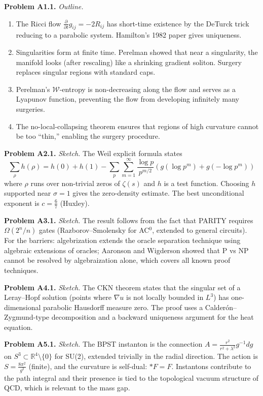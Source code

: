 \medskip\noindent\textbf{Problem A1.1.} \textit{Outline.}
\begin{enumerate}
\item[(a)] The Ricci flow $\frac{\partial}{\partial t} g_{ij} = -2R_{ij}$ has short-time existence by the DeTurck trick reducing to a parabolic system. Hamilton's 1982 paper gives uniqueness.
\item[(b)] Singularities form at finite time. Perelman showed that near a singularity, the manifold looks (after rescaling) like a shrinking gradient soliton. Surgery replaces singular regions with standard caps.
\item[(c)] Perelman's $\mathcal{W}$-entropy is non-decreasing along the flow and serves as a Lyapunov function, preventing the flow from developing infinitely many surgeries.
\item[(d)] The no-local-collapsing theorem ensures that regions of high curvature cannot be too ``thin,'' enabling the surgery procedure.
\end{enumerate}

\medskip\noindent\textbf{Problem A2.1.} \textit{Sketch.} The Weil explicit formula states
\[
\sum_\rho h(\rho) = h(0) + h(1) - \sum_p \sum_{m=1}^\infty \frac{\log p}{p^{m/2}} (g(\log p^m) + g(-\log p^m))
\]
where $\rho$ runs over non-trivial zeros of $\zeta(s)$ and $h$ is a test function. Choosing $h$ supported near $\sigma = 1$ gives the zero-density estimate. The best unconditional exponent is $c = \frac{6}{7}$ (Huxley).

\medskip\noindent\textbf{Problem A3.1.} \textit{Sketch.} The result follows from the fact that PARITY requires $\Omega(2^n / n)$ gates (Razborov--Smolensky for AC$^0$, extended to general circuits). For the barriers: algebrization extends the oracle separation technique using algebraic extensions of oracles; Aaronson and Wigderson showed that P vs NP cannot be resolved by algebraization alone, which covers all known proof techniques.

\medskip\noindent\textbf{Problem A4.1.} \textit{Sketch.} The CKN theorem states that the singular set of a Leray--Hopf solution (points where $\nabla u$ is not locally bounded in $L^3$) has one-dimensional parabolic Hausdorff measure zero. The proof uses a Calder\'{o}n--Zygmund-type decomposition and a backward uniqueness argument for the heat equation.

\medskip\noindent\textbf{Problem A5.1.} \textit{Sketch.} The BPST instanton is the connection $A = \frac{r^2}{r^2 + \lambda^2} g^{-1} dg$ on $S^3 \subset \mathbb{R}^4 \setminus \{0\}$ for SU(2), extended trivially in the radial direction. The action is $S = \frac{8\pi^2}{g^2}$ (finite), and the curvature is self-dual: $*F = F$. Instantons contribute to the path integral and their presence is tied to the topological vacuum structure of QCD, which is relevant to the mass gap.

